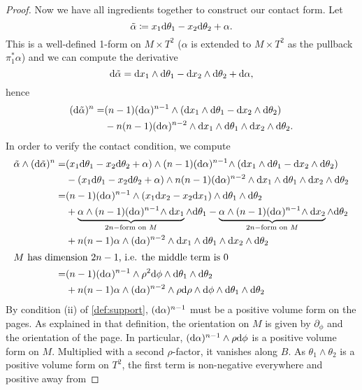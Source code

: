 \begin{proof}
    Now we have all ingredients together to construct our contact form.
    Let
    \[
        \tilde \alpha \coloneqq x_1 \mathrm{d} \theta_1 - x_2 \mathrm{d} \theta_2 + \alpha.
    \]
    This is a well-defined 1-form on $M \times T^2$ ($\alpha$ is extended to $M\times T^2$ as the pullback $\pi_1^*\alpha$) and we can compute the derivative
    \[
        \mathrm{d} \tilde \alpha = \mathrm{d} x_1 \wedge \mathrm{d} \theta_1 - \mathrm{d} x_2 \wedge \mathrm{d} \theta_2 + \mathrm{d} \alpha,
    \]
    hence
    \begin{align*}
        (\mathrm{d} \tilde \alpha)^n =& (n-1)(\mathrm{d} \alpha)^{n-1}\wedge (\mathrm{d} x_1 \wedge \mathrm{d} \theta_1 - \mathrm{d} x_2 \wedge \mathrm{d} \theta_2)\\
        &- n(n-1)(\mathrm{d} \alpha)^{n-2}\wedge \mathrm{d} x_1 \wedge \mathrm{d} \theta_1 \wedge \mathrm{d} x_2 \wedge \mathrm{d} \theta_2.
    \end{align*}
    In order to verify the contact condition, we compute
    \begin{align*}
        \tilde \alpha \wedge (\mathrm{d} \tilde \alpha)^n =& (x_1 \mathrm{d} \theta_1 - x_2 \mathrm{d} \theta_2 + \alpha) \wedge (n-1)(\mathrm{d} \alpha)^{n-1}\!\wedge (\mathrm{d} x_1 \wedge \mathrm{d} \theta_1 - \mathrm{d} x_2 \wedge \mathrm{d} \theta_2)\\
        &- (x_1 \mathrm{d} \theta_1 - x_2 \mathrm{d} \theta_2 + \alpha) \wedge n(n-1)(\mathrm{d} \alpha)^{n-2}\wedge \mathrm{d} x_1 \wedge \mathrm{d} \theta_1 \wedge \mathrm{d} x_2 \wedge \mathrm{d} \theta_2\\
        =& (n-1)(\mathrm{d} \alpha)^{n-1}\wedge(x_1\mathrm{d} x_2 - x_2 \mathrm{d} x_1)\wedge \mathrm{d} \theta_1 \wedge \mathrm{d} \theta_2\\
        &+\underbrace{\alpha\wedge(n-1)(\mathrm{d} \alpha)^{n-1}\!\wedge \mathrm{d} x_1}_{2n-\text{form on } M} \wedge \mathrm{d} \theta_1 - \underbrace{\alpha \wedge (n-1)(\mathrm{d} \alpha)^{n-1}\!\wedge\mathrm{d} x_2}_{2n-\text{form on } M} \wedge \mathrm{d} \theta_2\\
        & + n(n-1)\alpha\wedge(\mathrm{d} \alpha)^{n-2}\wedge \mathrm{d} x_1 \wedge \mathrm{d} \theta_1 \wedge \mathrm{d} x_2 \wedge \mathrm{d} \theta_2\\
        \intertext{$M$ has dimension $2n-1$, i.e. the middle term is 0}
        =& (n-1)(\mathrm{d} \alpha)^{n-1}\wedge \rho^2 \mathrm{d}\phi \wedge \mathrm{d} \theta_1 \wedge \mathrm{d} \theta_2\\
        & + n(n-1)\alpha \wedge (\mathrm{d} \alpha)^{n-2}\wedge \rho \mathrm{d}\rho \wedge \mathrm{d} \phi \wedge \mathrm{d} \theta_1 \wedge \mathrm{d} \theta_2\\
    \end{align*}
    By condition (ii) of \cref{def:support}, $(\mathrm{d} \alpha)^{n-1}$ must be a positive volume form on the pages. As explained in that definition, the orientation on $M$ is given by $\partial_\phi$ and the orientation of the page. In particular, $(\mathrm{d} \alpha)^{n-1} \wedge \rho \mathrm{d} \phi$ is a positive volume form on $M$. Multiplied with a second $\rho$-factor, it vanishes along $B$. As $\theta_1 \wedge \theta_2$ is a positive volume form on $T^2$, the first term is non-negative everywhere and positive away from 

\end{proof}
